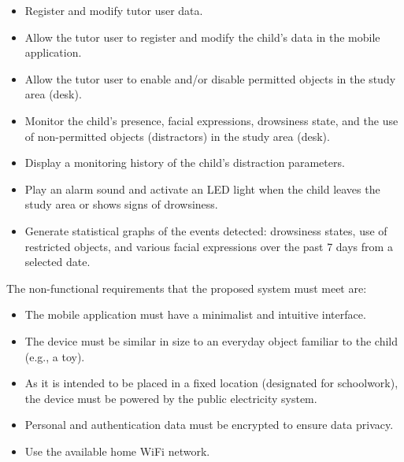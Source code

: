 				\begin{itemize}
					\item Register and modify tutor user data.
					
					\item Allow the tutor user to register and modify the child’s data in the mobile application.
					
					\item Allow the tutor user to enable and/or disable permitted objects in the study area (desk).
					
					\item Monitor the child's presence, facial expressions, drowsiness state, and the use of non-permitted objects (distractors) in the study area (desk).
					
					\item Display a monitoring history of the child’s distraction parameters.
					
					\item Play an alarm sound and activate an LED light when the child leaves the study area or shows signs of drowsiness.
					
					\item Generate statistical graphs of the events detected: drowsiness states, use of restricted objects, and various facial expressions over the past 7 days from a selected date.
				\end{itemize}
				
				The non-functional requirements that the proposed system must meet are:
				
				\begin{itemize}
					\item The mobile application must have a minimalist and intuitive interface.
					
					\item The device must be similar in size to an everyday object familiar to the child (e.g., a toy).
					
					\item As it is intended to be placed in a fixed location (designated for schoolwork), the device must be powered by the public electricity system.
					
					\item Personal and authentication data must be encrypted to ensure data privacy.
					
					\item Use the available home WiFi network.
				\end{itemize}
				
